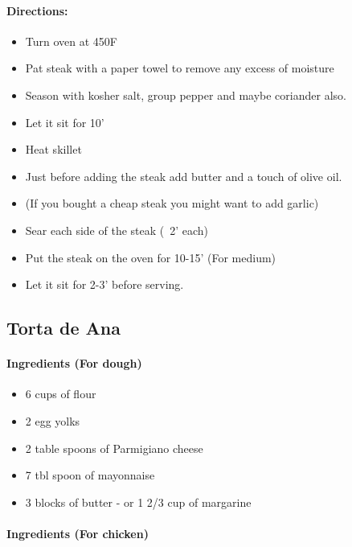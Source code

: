 \documentclass{article}
\begin{document}
\paragraph{Directions:}
\begin{itemize}
	\item Turn oven at 450F
	\item Pat steak with a paper towel to remove any excess of moisture
	\item Season with kosher salt, group pepper and maybe coriander also.
	\item Let it sit for 10'
	\item Heat skillet
	\item Just before adding the steak add butter and a touch of olive oil.
	\item (If you bought a cheap steak you might want to add garlic)
	\item Sear each side of the steak (~2' each)
	\item Put the steak on the oven for 10-15' (For medium)
	\item Let it sit for 2-3' before serving.
\end{itemize}

\subsection{Torta de Ana}

\paragraph{Ingredients (For dough)}

\begin{itemize}
	\item 6 cups of flour
	\item 2 egg yolks
	\item 2 table spoons of Parmigiano cheese
	\item 7 tbl spoon of mayonnaise
	\item 3 blocks of butter - or 1 2/3 cup of margarine
\end{itemize}

\paragraph{Ingredients (For chicken)}
\end{document}
